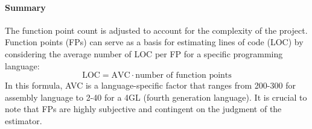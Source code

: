 \paragraph*{Summary}
The function point count is adjusted to account for the complexity of the project. 
Function points (FPs) can serve as a basis for estimating lines of code (LOC) by considering the average number of LOC per FP for a specific programming language:
\[\text{LOC}=\text{AVC}\cdot\text{number of function points}\]
In this formula, AVC is a language-specific factor that ranges from 200-300 for assembly language to 2-40 for a 4GL (fourth generation language).
It is crucial to note that FPs are highly subjective and contingent on the judgment of the estimator.